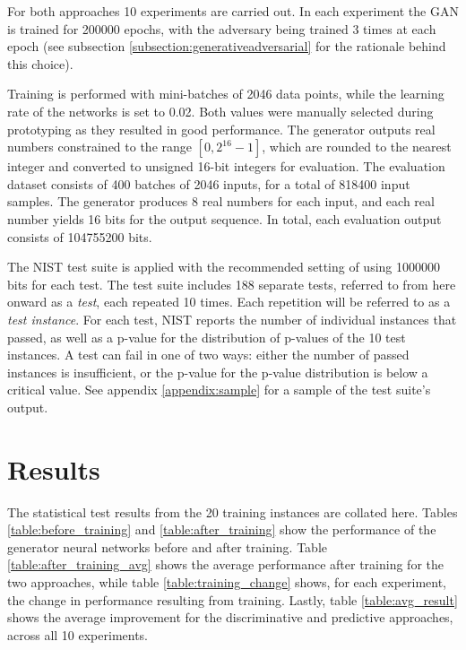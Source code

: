 \documentclass[12pt, titlepage]{report}
\theoremstyle{definition}
\begin{document}
For both approaches 10 experiments are carried out. In each experiment the GAN is trained for 200000 epochs, with the adversary being trained 3 times at each epoch (see subsection \ref{subsection:generativeadversarial} for the rationale behind this choice). 

Training is performed with mini-batches of 2046 data points, while the learning rate of the networks is set to 0.02. Both values were manually selected during prototyping as they resulted in good performance. The generator outputs real numbers constrained to the range $[0, 2^{16}-1]$, which are rounded to the nearest integer and converted to unsigned 16-bit integers for evaluation. The evaluation dataset consists of 400 batches of 2046 inputs, for a total of 818400 input samples. The generator produces 8 real numbers for each input, and each real number yields 16 bits for the output sequence. In total, each evaluation output consists of 104755200 bits. 

The NIST test suite is applied with the recommended setting of using 1000000 bits for each test. The test suite includes 188 separate tests, referred to from here onward as a \emph{test}, each repeated 10 times. Each repetition will be referred to as a \emph{test instance}. For each test, NIST reports the number of individual instances that passed, as well as a p-value for the distribution of p-values of the 10 test instances. A test can fail in one of two ways: either the number of passed instances is insufficient, or the p-value for the p-value distribution is below a critical value. See appendix \ref{appendix:sample} for a sample of the test suite's output.


\section{Results}
The statistical test results from the 20 training instances are collated here. Tables \ref{table:before_training} and \ref{table:after_training} show the performance of the generator neural networks before and after training. Table \ref{table:after_training_avg} shows the average performance after training for the two approaches, while table \ref{table:training_change} shows, for each experiment, the change in performance resulting from training. Lastly, table \ref{table:avg_result} shows the average improvement for the discriminative and predictive approaches, across all 10 experiments.
\end{document}
